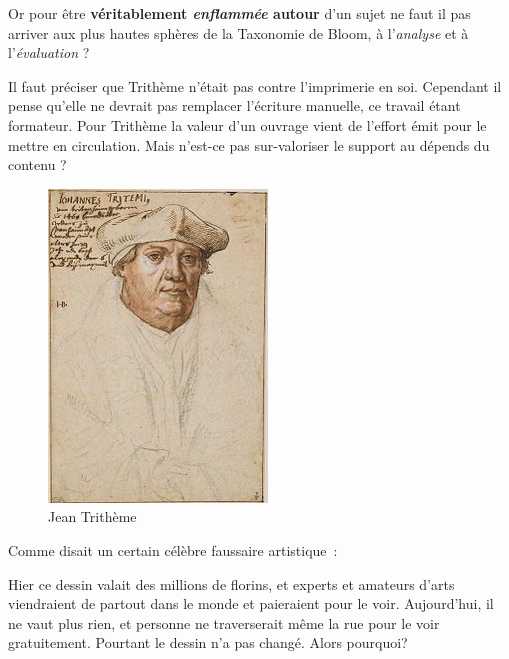 \begin{minipage}[H]{0.54\linewidth}
Or pour être \textbf{véritablement \emph{enflammée} autour }d'un sujet ne faut il pas arriver aux plus hautes sphères de la Taxonomie de Bloom, à l'\emph{analyse} et à l'\emph{évaluation} ?

Il faut préciser que Trithème n'était pas contre l'imprimerie en soi. Cependant il pense qu'elle ne devrait pas remplacer l'écriture manuelle, ce travail étant formateur\cite{abbot-trithemius}. Pour Trithème la valeur d'un ouvrage vient de l'effort émit pour le mettre en circulation. Mais n'est-ce pas sur-valoriser le support au dépends du contenu ?
\vspace{1cm}
\end{minipage}
\begin{minipage}[H]{0.44\linewidth}
  \begin{figure}[H]
  \centering
  \includegraphics[height=0.15\paperheight]{../resources/illustrations/trithemius}
  \caption{Jean Trithème}
  \end{figure}
\end{minipage}

Comme disait un certain célèbre faussaire artistique~: 

\begin{coolquote}
Hier ce dessin valait des millions de florins, et experts et amateurs d'arts viendraient de partout dans le monde et paieraient pour le voir. Aujourd'hui, il ne vaut plus rien, et personne ne traverserait même la rue pour le voir gratuitement. Pourtant le dessin n'a pas changé. Alors pourquoi?
\end{coolquote}

